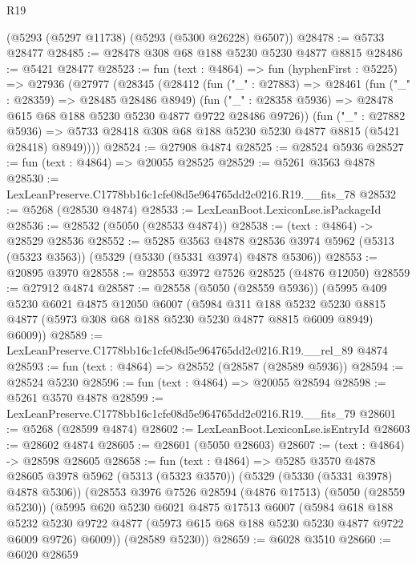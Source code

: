 \begin{lexlean}{R19}
\begin{coremodule}
    (@5293 (@5297 @11738) (@5293 (@5300 @26228) @6507))
@28478 := @5733 @28477
@28485 := @28478 @308 @68 @188 @5230 @5230 @4877 @8815
@28486 := @5421 @28477
@28523 := fun (text : @4864) =>
  fun (hyphenFirst : @5225) =>
  @27936
    (@27977
      (@28345
        (@28412
          (fun ("_" : @27883) =>
          @28461
            (fun ("_" : @28359) => @28485 @28486 @8949)
            (fun ("_" : @28358 @5936) => @28478 @615 @68 @188 @5230 @5230 @4877 @9722 @28486 @9726))
          (fun ("_" : @27882 @5936) =>
          @5733 @28418 @308 @68 @188 @5230 @5230 @4877 @8815 (@5421 @28418) @8949))))
@28524 := @27908 @4874
@28525 := @28524 @5936
@28527 := fun (text : @4864) => @20055 @28525
@28529 := @5261 @3563 @4878
@28530 := LexLeanPreserve.C1778bb16c1cfe08d5e964765dd2c0216.R19.__fits_78
@28532 := @5268 (@28530 @4874)
@28533 := LexLeanBoot.LexiconLse.isPackageId
@28536 := @28532 (@5050 (@28533 @4874))
@28538 := (text : @4864) -> @28529 @28536
@28552 := @5285
    @3563
    @4878
    @28536
    @3974
    @5962
    (@5313 (@5323 @3563))
    (@5329 (@5330 (@5331 @3974) @4878 @5306))
@28553 := @20895 @3970
@28558 := @28553 @3972 @7526 @28525 (@4876 @12050)
@28559 := @27912 @4874
@28587 := @28558
    (@5050 (@28559 @5936))
    (@5995
      @409
      @5230
      @6021
      @4875
      @12050
      @6007
      (@5984
        @311
        @188
        @5232
        @5230
        @8815
        @4877
        (@5973 @308 @68 @188 @5230 @5230 @4877 @8815 @6009 @8949)
        @6009))
@28589 := LexLeanPreserve.C1778bb16c1cfe08d5e964765dd2c0216.R19.__rel_89 @4874
@28593 := fun (text : @4864) => @28552 (@28587 (@28589 @5936))
@28594 := @28524 @5230
@28596 := fun (text : @4864) => @20055 @28594
@28598 := @5261 @3570 @4878
@28599 := LexLeanPreserve.C1778bb16c1cfe08d5e964765dd2c0216.R19.__fits_79
@28601 := @5268 (@28599 @4874)
@28602 := LexLeanBoot.LexiconLse.isEntryId
@28603 := @28602 @4874
@28605 := @28601 (@5050 @28603)
@28607 := (text : @4864) -> @28598 @28605
@28658 := fun (text : @4864) =>
  @5285
    @3570
    @4878
    @28605
    @3978
    @5962
    (@5313 (@5323 @3570))
    (@5329 (@5330 (@5331 @3978) @4878 @5306))
    (@28553
      @3976
      @7526
      @28594
      (@4876 @17513)
      (@5050 (@28559 @5230))
      (@5995
        @620
        @5230
        @6021
        @4875
        @17513
        @6007
        (@5984
          @618
          @188
          @5232
          @5230
          @9722
          @4877
          (@5973 @615 @68 @188 @5230 @5230 @4877 @9722 @6009 @9726)
          @6009))
      (@28589 @5230))
@28659 := @6028 @3510
@28660 := @6020 @28659

\end{coremodule}
\end{lexlean}
